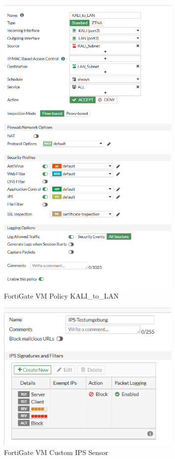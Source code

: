 \documentclass[12pt]{scrreprt}
\begin{document}
\begin{thebibliography}{99}
\begin{figure}[htbp]
	\centering
	\includegraphics[width=0.8\textwidth]{forti-Kali-LAN-Policy01.png}
	\caption{FortiGate VM Policy KALI\_to\_LAN}
	\label{fig:forti-Kali-LAN-P01} %
\end{figure}

\begin{figure}[htbp]
	\centering
	\includegraphics[width=0.8\textwidth]{forti-IPS-sensor.png}
	\caption{FortiGate VM Custom IPS Sensor}
	\label{fig:forti-IPS-sensor} %
\end{figure}


\end{thebibliography}
\end{document}

